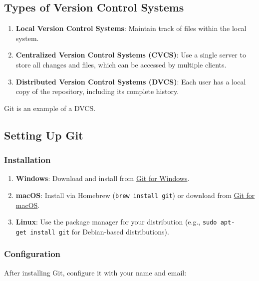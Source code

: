 \documentclass[
  letterpaper,
  DIV=11,
  numbers=noendperiod]{scrreprt}
\providecommand{\tightlist}{%
  \setlength{\itemsep}{0pt}\setlength{\parskip}{0pt}}\usepackage{longtable,booktabs,array}
\begin{document}
\subsection{Types of Version Control
Systems}\label{types-of-version-control-systems}

\begin{enumerate}
\def\labelenumi{\arabic{enumi}.}
\tightlist
\item
  \textbf{Local Version Control Systems}: Maintain track of files within
  the local system.
\item
  \textbf{Centralized Version Control Systems (CVCS)}: Use a single
  server to store all changes and files, which can be accessed by
  multiple clients.
\item
  \textbf{Distributed Version Control Systems (DVCS)}: Each user has a
  local copy of the repository, including its complete history.
\end{enumerate}

Git is an example of a DVCS.

\subsection{Setting Up Git}\label{setting-up-git}

\subsubsection{Installation}\label{installation-3}

\begin{enumerate}
\def\labelenumi{\arabic{enumi}.}
\tightlist
\item
  \textbf{Windows}: Download and install from
  \href{https://gitforwindows.org/}{Git for Windows}.
\item
  \textbf{macOS}: Install via Homebrew (\texttt{brew\ install\ git}) or
  download from \href{https://git-scm.com/download/mac}{Git for macOS}.
\item
  \textbf{Linux}: Use the package manager for your distribution (e.g.,
  \texttt{sudo\ apt-get\ install\ git} for Debian-based distributions).
\end{enumerate}

\subsubsection{Configuration}\label{configuration}

After installing Git, configure it with your name and email:
\end{document}
